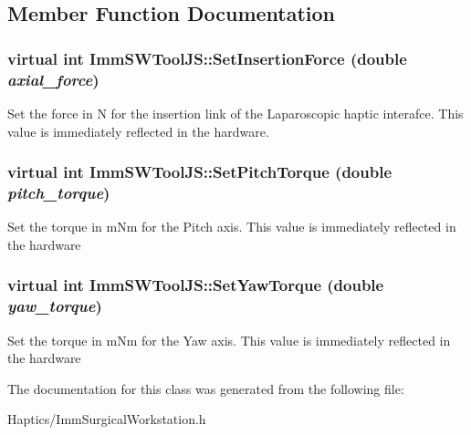 \subsection{Member Function Documentation}
\hypertarget{classImmSWToolJS_a0525da3b9b1274d6dc747da86da49552}{
\subsubsection[{SetInsertionForce}]{\setlength{\rightskip}{0pt plus 5cm}virtual int ImmSWToolJS::SetInsertionForce (double {\em axial\_\-force})}}
\label{classImmSWToolJS_a0525da3b9b1274d6dc747da86da49552}
Set the force in N for the insertion link of the Laparoscopic haptic interafce. This value is immediately reflected in the hardware. \hypertarget{classImmSWToolJS_a9512db780275a00a5ba48f1d4f160549}{
\subsubsection[{SetPitchTorque}]{\setlength{\rightskip}{0pt plus 5cm}virtual int ImmSWToolJS::SetPitchTorque (double {\em pitch\_\-torque})}}
\label{classImmSWToolJS_a9512db780275a00a5ba48f1d4f160549}
Set the torque in mNm for the Pitch axis. This value is immediately reflected in the hardware \hypertarget{classImmSWToolJS_ad0901e3f1fc9fb3788f96ec74d43da3a}{
\subsubsection[{SetYawTorque}]{\setlength{\rightskip}{0pt plus 5cm}virtual int ImmSWToolJS::SetYawTorque (double {\em yaw\_\-torque})}}
\label{classImmSWToolJS_ad0901e3f1fc9fb3788f96ec74d43da3a}
Set the torque in mNm for the Yaw axis. This value is immediately reflected in the hardware 

The documentation for this class was generated from the following file:\begin{DoxyCompactItemize}
\item 
Haptics/ImmSurgicalWorkstation.h\end{DoxyCompactItemize}
